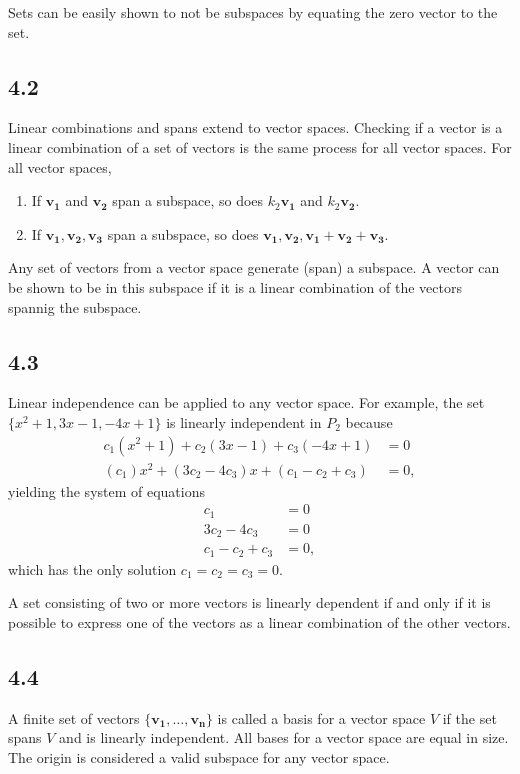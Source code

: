 \documentclass{article}
\begin{document}
    Sets can be easily shown to not be subspaces by equating the zero vector to the set.

    \subsection*{4.2}
    Linear combinations and spans extend to vector spaces. 
    Checking if a vector is a linear combination of a set of vectors 
    is the same process for all vector spaces.
    For all vector spaces,
    \begin{enumerate}
        \item If $\mathbf{v_1}$ and $\mathbf{v_2}$ span a subspace, so does $k_2 \mathbf{v_1}$ and $k_2 \mathbf{v_2}$.
        \item If $\mathbf{v_1, v_2, v_3}$ span a subspace, so does $\mathbf{v_1, v_2, v_1 + v_2 + v_3}$.
    \end{enumerate}

    Any set of vectors from a vector space generate (span) a subspace.
    A vector can be shown to be in this subspace if it is a linear combination of the vectors spannig the subspace.

    \subsection*{4.3}
    Linear independence can be applied to any vector space.
    For example, 
    the set $\{x^2 + 1, 3x - 1, -4x +  1\}$ is linearly independent in $P_2$ 
    because 
    \begin{align*}
        c_1(x^2 + 1) + c_2(3x - 1) + c_3(-4x + 1) &= 0 \\
        (c_1)x^2 + (3c_2 - 4c_3)x + (c_1 - c_2 + c_3) &= 0,
    \end{align*}
    yielding the system of equations
    \begin{align*}
        c_1 &= 0 \\
        3c_2 - 4c_3 &= 0 \\
        c_1 - c_2 + c_3 &= 0,
    \end{align*}
    which has the only solution $c_1 = c_2 = c_3 = 0$.

    A set consisting of two or more vectors is linearly dependent if and only if  
    it is possible to express one of the vectors as a linear combination of the other vectors.

    \subsection*{4.4}
    A finite set of vectors $\{\mathbf{v_1, \dots, v_n}\}$ is called a basis for a vector space $V$ 
    if the set spans $V$ and is linearly independent.
    All bases for a vector space are equal in size.
    The origin is considered a valid subspace for any vector space.
    
\end{document}
